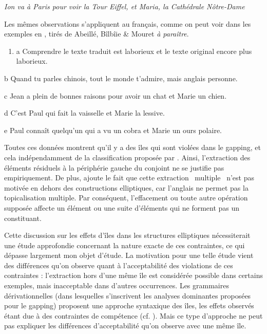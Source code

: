 {\itshape
Ion va à Paris pour voir la Tour Eiffel, et Maria, la Cathédrale Nôtre-Dame}

Les mêmes observations s'appliquent au français, comme on peut voir dans les exemples en , tirés de Abeillé, Bîlbîie \& Mouret \textit{à paraître}.


\begin{enumerate}
\item \label{bkm:Ref289720105}a   Comprendre le texte traduit est laborieux et le texte original encore plus laborieux.  


\end{enumerate}
  b  Quand tu parles chinois, tout le monde t'admire, mais anglais personne.

  c  Jean a plein de bonnes raisons pour avoir un chat et Marie un chien.

  d  C'est Paul qui fait la vaisselle et Marie la lessive.

  e  Paul connaît quelqu'un qui a vu un cobra et Marie un ours polaire.

Toutes ces données montrent qu'il y a des îles qui sont violées dans le gapping, et cela indépendamment de la classification proposée par \citet{Merchant2001}. Ainsi, l'extraction des éléments résiduels à la périphérie gauche du conjoint ne se justifie pas empiriquement. De plus, \citet[463]{Culicover2009} ajoute le fait que cette extraction {\guillemotleft}~multiple~{\guillemotright} n'est pas motivée en dehors des constructions elliptiques, car l'anglais ne permet pas la topicalisation multiple. Par conséquent, l'effacement ou toute autre opération supposée affecte un élément ou une suite d'éléments qui ne forment pas un constituant.

Cette discussion sur les effets d'îles dans les structures elliptiques nécessiterait une étude approfondie concernant la nature exacte de ces contraintes, ce qui dépasse largement mon objet d'étude. La motivation pour une telle étude vient des différences qu'on observe quant à l'acceptabilité des violations de ces contraintes : l'extraction hors d'une même île est considérée possible dans certains exemples, mais inacceptable dans d'autres occurrences. Les grammaires dérivationnelles (dans lesquelles s'inscrivent les analyses dominantes proposées pour le gapping) proposent une approche syntaxique des îles, les effets observés étant due à des contraintes de compétence (cf. \citet{Ross1967}). Mais ce type d'approche ne peut pas expliquer les différences d'acceptabilité qu'on observe avec une même île. 

